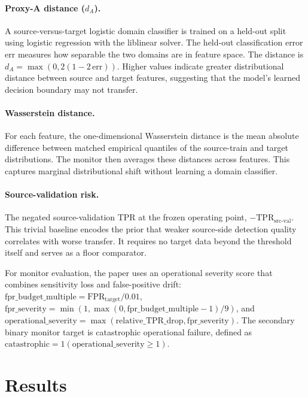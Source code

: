 \documentclass[preprint,12pt]{elsarticle}
\begin{document}
\paragraph{Proxy-A distance ($d_A$).} A source-versus-target logistic domain classifier is trained on a held-out split using logistic regression with the liblinear solver. The held-out classification error $\mathrm{err}$ measures how separable the two domains are in feature space. The distance is $d_A = \max(0, 2(1 - 2\,\mathrm{err}))$. Higher values indicate greater distributional distance between source and target features, suggesting that the model's learned decision boundary may not transfer.

\paragraph{Wasserstein distance.} For each feature, the one-dimensional Wasserstein distance is the mean absolute difference between matched empirical quantiles of the source-train and target distributions. The monitor then averages these distances across features. This captures marginal distributional shift without learning a domain classifier.

\paragraph{Source-validation risk.} The negated source-validation TPR at the frozen operating point, $-\mathrm{TPR}_{\mathrm{src\text{-}val}}$. This trivial baseline encodes the prior that weaker source-side detection quality correlates with worse transfer. It requires no target data beyond the threshold itself and serves as a floor comparator.

For monitor evaluation, the paper uses an operational severity score that combines sensitivity loss and false-positive drift: $\mathrm{fpr\_budget\_multiple} = \mathrm{FPR}_{\mathrm{target}} / 0.01$, $\mathrm{fpr\_severity} = \min\!\left(1, \max(0, \mathrm{fpr\_budget\_multiple} - 1) / 9\right)$, and $\mathrm{operational\_severity} = \max(\mathrm{relative\_TPR\_drop}, \mathrm{fpr\_severity})$. The secondary binary monitor target is catastrophic operational failure, defined as $\mathrm{catastrophic} = 1(\mathrm{operational\_severity} \geq 1)$.

\section{Results}
\end{document}
